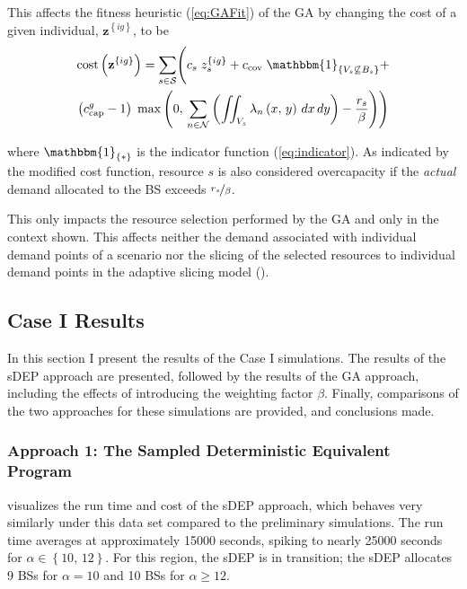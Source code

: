 \documentclass[12pt,dvipsnames]{report}
\newcommand{\ind}[1]{\mathbbm{1}_{\left\{ #1 \right\}}}
\begin{document}
This affects the fitness heuristic (\cref{eq:GAFit}) of the GA by changing the cost of a given individual, $\textbf{z}^{\left\{ ig \right\}}$, to be
\begin{multline} \label{eq:GAModifiedCost}
\mathrm{cost}\left( \textbf{z}^{\left\{ ig \right\}} \right) = \sum_{s \in \mathcal{S}} \Biggl( c_s \; z_s^{\left\{ ig \right\}} + c_\text{cov} \; \ind{V_s \not\subseteq B_s} + \\ \left( c_\text{cap}^g - 1 \right) \; \max\left( 0,\, \sum_{n \in \mathcal{N}} \left( \iint_{V_s} \lambda_n\left( x,\, y \right)\, dx\, dy \right) - \frac{r_s}{\beta} \right) \Biggr)
\end{multline}

\noindent where $\ind{*}$ is the indicator function (\cref{eq:indicator}).  As indicated by the modified cost function, resource $s$ is also considered overcapacity if the \emph{actual} demand allocated to the BS exceeds $\nicefrac{r_s}{\beta}$.

This only impacts the resource selection performed by the GA and only in the context shown.  This affects neither the demand associated with individual demand points of a scenario nor the slicing of the selected resources to individual demand points in the adaptive slicing model ().

\subsection{Case I Results} \label{subsec:caseI_results}

In this section I present the results of the Case I simulations.  The results of the sDEP approach are presented, followed by the results of the GA approach, including the effects of introducing the weighting factor $\beta$.  Finally, comparisons of the two approaches for these simulations are provided, and conclusions made.

\subsubsection{Approach 1: The Sampled Deterministic Equivalent Program}

 visualizes the run time and cost of the sDEP approach, which behaves very similarly under this data set compared to the preliminary simulations.  The run time averages at approximately 15000 seconds, spiking to nearly 25000 seconds for $\alpha \in \left\{ 10,\, 12 \right\}$.  For this region, the sDEP is in transition; the sDEP allocates 9 BSs for $\alpha = 10$ and 10 BSs for $\alpha \geq 12$.
\end{document}
